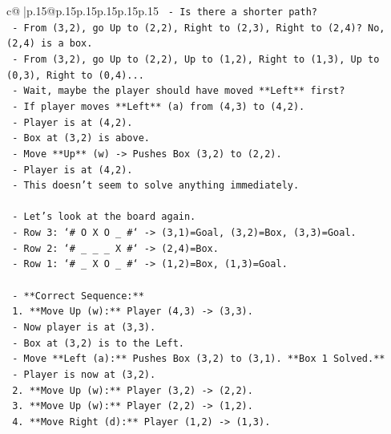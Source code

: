 \documentclass{article}
\begin{document}
{\begin{supertabular}{c@{$\;$}|p{.15\linewidth}@{}p{.15\linewidth}p{.15\linewidth}p{.15\linewidth}p{.15\linewidth}p{.15\linewidth}}
{{{\texttt{            {-} Is there a shorter path?} \\
\texttt{            {-} From (3,2), go Up to (2,2), Right to (2,3), Right to (2,4)? No, (2,4) is a box.} \\
\texttt{            {-} From (3,2), go Up to (2,2), Up to (1,2), Right to (1,3), Up to (0,3), Right to (0,4)...} \\
\texttt{            {-} Wait, maybe the player should have moved **Left** first?} \\
\texttt{            {-} If player moves **Left** (a) from (4,3) to (4,2).} \\
\texttt{                {-} Player is at (4,2).} \\
\texttt{                {-} Box at (3,2) is above.} \\
\texttt{                {-} Move **Up** (w) {-}> Pushes Box (3,2) to (2,2).} \\
\texttt{                {-} Player is at (4,2).} \\
\texttt{                {-} This doesn't seem to solve anything immediately.} \\
\\ 
\texttt{    {-} Let's look at the board again.} \\
\texttt{    {-} Row 3: `\# O X O \_ \#` {-}> (3,1)=Goal, (3,2)=Box, (3,3)=Goal.} \\
\texttt{    {-} Row 2: `\# \_ \_ \_ X \#` {-}> (2,4)=Box.} \\
\texttt{    {-} Row 1: `\# \_ X O \_ \#` {-}> (1,2)=Box, (1,3)=Goal.} \\
\\ 
\texttt{    {-} **Correct Sequence:**} \\
\texttt{        1.  **Move Up (w):** Player (4,3) {-}> (3,3).} \\
\texttt{            {-} Now player is at (3,3).} \\
\texttt{            {-} Box at (3,2) is to the Left.} \\
\texttt{            {-} Move **Left (a):** Pushes Box (3,2) to (3,1). **Box 1 Solved.**} \\
\texttt{            {-} Player is now at (3,2).} \\
\texttt{        2.  **Move Up (w):** Player (3,2) {-}> (2,2).} \\
\texttt{        3.  **Move Up (w):** Player (2,2) {-}> (1,2).} \\
\texttt{        4.  **Move Right (d):** Player (1,2) {-}> (1,3).} \\
}}}
\end{supertabular}}
\end{document}
